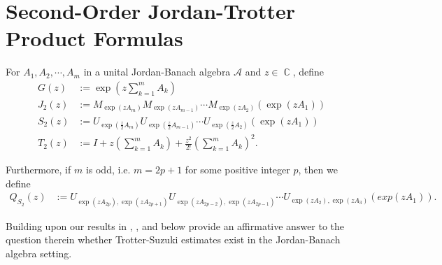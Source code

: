 \documentclass{article}
\theoremstyle{plain} %
\numberwithin{equation}{section}
\newcommand{\zw}[1]{{\color{UGARed}{#1\textsuperscript{ZW}}}}
\DeclareMathOperator{\Cdb}{{\mathbb C}}
\begin{document}

\section{Second-Order Jordan-Trotter Product Formulas}\label{sec:2order} 

 
   For $\displaystyle A_1, A_2,\cdots, A_m$ in a unital Jordan-Banach algebra $\mathcal{A}$ and $z \in\Cdb$, define
    \begin{align} \label{notion:G}
    G(z)&:=\exp\left(z\sum_{k=1}^m A_k\right)
    \\ 
    \label{notion:J2}
    J_2(z)&:=M_{\exp(z A_m)}M_{\exp(z A_{m-1})}\cdots M_{\exp(z A_2)}(\exp(z A_1)) \\
    \label{notion:S2}
    S_2(z)&:=U_{\exp(\frac{z}{2}A_m)}U_{\exp(\frac{z}{2}A_{m-1})}\cdots U_{\exp(\frac{z}{2}A_2)}(\exp(zA_1))\\
    \label{notion:T2}
    T_2(z)&:=I+z\left( \sum_{k=1}^m A_k\right)+\frac{z^2}{2!}\left( \sum\limits_{k=1}^m A_k \right)^2. 
    \end{align}

Furthermore, if $m$ is odd, i.e. $m=2p+1$ for some positive integer $p$, then we define
\begin{align}\label{notion:QS2}
Q_{S_{2}}(z)&:=U_{\exp(zA_{2p}), \exp(zA_{2p+1})}U_{\exp(zA_{2p-2}), \exp(zA_{2p-1})}\cdots U_{\exp(zA_2), \exp(zA_3)}(exp(zA_1)).
\end{align}

Building upon our results in \cite{chehade:wang:wang:2024:suzuki}, ,  and  below provide an affirmative answer to the question therein whether 
Trotter-Suzuki estimates exist in the Jordan-Banach algebra setting.
\end{document}
